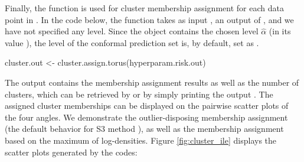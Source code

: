 
Finally, the function  is used for cluster membership assignment for each data point in . In the code below, the function  takes as input , an output of , and we have not specified any level. 
Since the object  contains the chosen level $\hat\alpha$ (in its value ), the level of the conformal prediction set is, by default, set as .

\begin{example}
cluster.out <- cluster.assign.torus(hyperparam.risk.out)
\end{example}

The output  contains the membership assignment results as well as the number of clusters, which can be retrieved by  or by simply printing the output . 
The assigned cluster memberships can be displayed on the pairwise scatter plots of the four angles. We demonstrate the outlier-disposing membership assignment (the default behavior for S3 method ), as well as the membership assignment based on the maximum of log-densities. Figure \ref{fig:cluster_ile} displays the scatter plots generated by the codes:  


